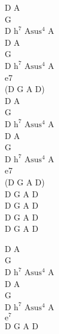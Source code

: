 \begin{chord}
    D A\\
    G\\
    D $\mathrm{h^{7}}$ $\mathrm{Asus^{4}}$ A\\
    D A\\
    G\\
    D $\mathrm{h^{7}}$ $\mathrm{Asus^{4}}$ A\\
    e{7}\\
    (D G A D)\\
    D A\\
    G\\
    D $\mathrm{h^{7}}$ $\mathrm{Asus^{4}}$ A\\
    D A\\
    G\\
    D $\mathrm{h^{7}}$ $\mathrm{Asus^{4}}$ A\\
    e{7}\\
    (D G A D)\\
    D G A D\\
    D G A D\\
    D G A D\\
    D G A D

    D A\\
    G\\
    D $\mathrm{h^{7}}$ $\mathrm{Asus^{4}}$ A\\
    D A\\
    G\\
    D $\mathrm{h^{7}}$ $\mathrm{Asus^{4}}$ A\\
    $\mathrm{e^{7}}$\\
    D G A D
\end{chord}
